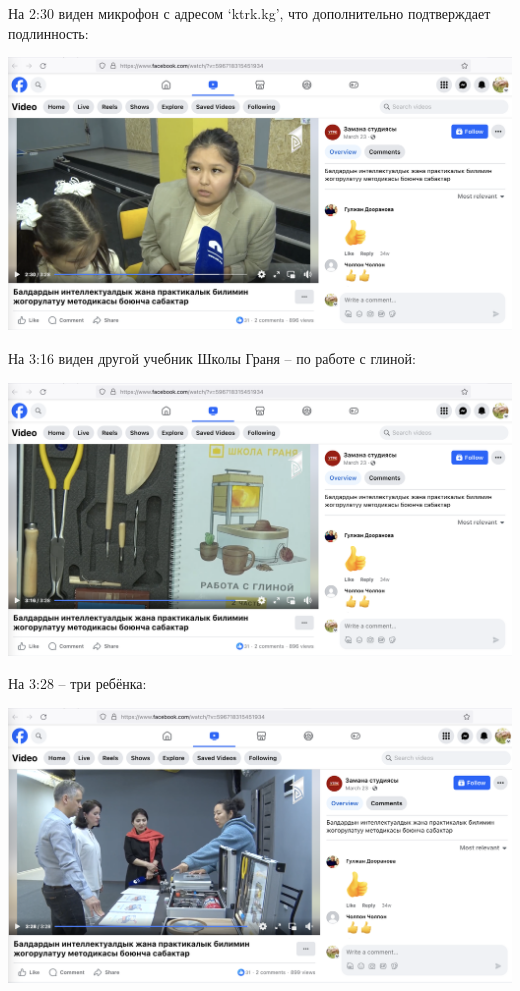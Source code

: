 

На 2:30 виден микрофон с адресом `ktrk.kg', что дополнительно подтверждает подлинность:

\includegraphics[width=\textwidth]{2_30_girls}



На 3:16 виден другой учебник Школы Граня -- по работе с глиной:

\includegraphics[width=\textwidth]{3_16_book-clay}



На 3:28 -- три ребёнка:

\includegraphics[width=\textwidth]{3_28_stand}







\pagebreak
